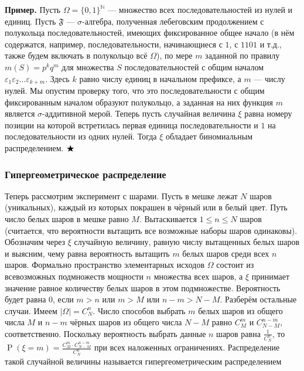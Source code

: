 \documentclass[12pt]{article}
\numberwithin{theorem}{section}
\theoremstyle{definition}
\newenvironment{example}{\indent \textbf{Пример.}}{$ \hfill \bigstar $}
\newcommand{\defin}[2]{\hypertarget{#2}{{\color{red} #1}}}
\newcommand{\prob}{\operatorname{P}}
\newcommand{\events}{\mathfrak{F}}
\begin{document}
	\begin{example}
		Пусть $ \Omega = \{0,1\}^{\mathbb{N}} $ --- множество всех последовательностей из нулей и единиц.
		Пусть $ \events $ --- $ \sigma $-алгебра, полученная лебеговским продолжением с полукольца последовательностей,
		имеющих фиксированное общее начало 
		(в нём содержатся, например, последовательности, начинающиеся с $ 1 $, с $ 1101 $ и т.д., 
		также будем включать в полукольцо всё $ \Omega $), 
		по мере $ m $ заданной по правилу $ m(S) = p^kq^m $ для множества $ S $ последовательностей с общим началом
		$ \varepsilon_1\varepsilon_2\ldots\varepsilon_{k + m} $. Здесь $ k $ равно числу единиц в начальном префиксе, 
		а $ m $ --- числу нулей. 
		Мы опустим проверку того, что это последовательности с общим фиксированным началом образуют полукольцо,
		а заданная на них функция $ m $ является $ \sigma $-аддитивной мерой.
		Теперь пусть случайная величина $ \xi $ равна номеру позиции на которой встретилась первая единица последовательности
		и $ 1 $ на последовательности из одних нулей.
		Тогда $ \xi $ обладает биномиальным распределением.
	\end{example}
	
	\subsubsection{Гипергеометрическое распределение}
	
	Теперь рассмотрим эксперимент с шарами. Пусть в мешке лежат $ N $ шаров (уникальных), 
	каждый из которых покрашен в чёрный или в белый цвет.
	Путь число белых шаров в мешке равно $ M $. Вытаскивается $ 1 \leqslant n \leqslant N $ шаров
	(считается, что вероятности вытащить все возможные наборы шаров одинаковы).
	Обозначим через $ \xi $ случайную величину, равную числу вытащенных белых шаров и выясним, чему равна вероятность
	вытащить $ m $ белых шаров среди всех $ n $ шаров.
	Формально пространство элементарных исходов $ \Omega $ состоит из всевозможных подмножеств мощности $ n $
	множества всех шаров, а $ \xi $ принимает значение равное количеству белых шаров в этом подмножестве.
	Вероятность будет равна $ 0 $, если $ m > n $ или $ m > M $ или $ n - m > N - M $. Разберём остальные случаи.
	Имеем $ |\Omega| = C_N^n $. Число способов выбрать $ m $ белых шаров из общего числа $ M $
	и $ n - m $ чёрных шаров из общего числа $ N - M $ равно $ C_M^m $ и $ C_{N - M}^{n - m} $, соответственно.
	Поскольку вероятность выбрать данные $ n $ шаров равна $ \tfrac{1}{C_N^n} $,
	то $ \prob(\xi = m) = \tfrac{C_M^m \cdot C_{N - M}^{n - m}}{C_N^n} $ при всех наложенных ограничениях.
	Распределение такой случайной величины называется \defin{гипергеометрическим распределением}{hypergeometric-distribution}
	
\end{document}
